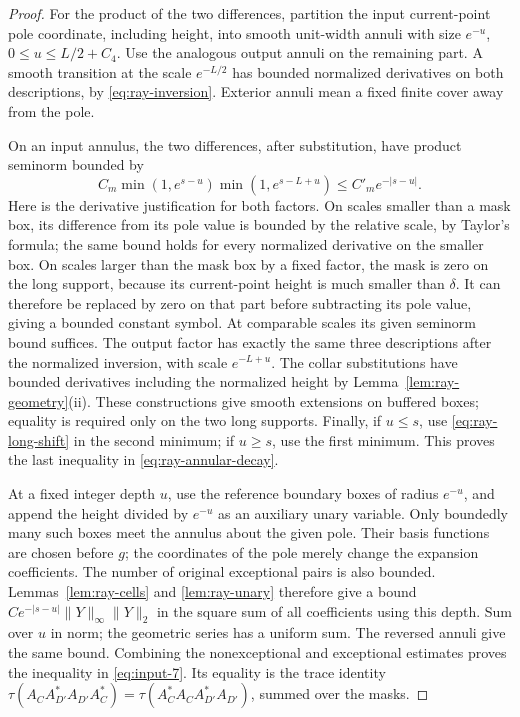 \begin{proof}
For the product of the two differences, partition the input
current-point pole coordinate, including height, into smooth
unit-width annuli with size \(e^{-u}\),
\(0\le u\le L/2+C_4\).  Use the analogous output annuli on the
remaining part.  A smooth transition at the scale \(e^{-L/2}\)
has bounded normalized derivatives on both descriptions, by
\eqref{eq:ray-inversion}.  Exterior annuli mean a fixed
finite cover away from the pole.

On an input annulus, the two differences, after substitution, have
product seminorm bounded by
\begin{equation}\label{eq:ray-annular-decay}
 C_m\min(1,e^{s-u})\min(1,e^{s-L+u})
                         \le C'_m e^{-|s-u|}.
\end{equation}
Here is the derivative justification for both factors.  On scales
smaller than a mask box, its difference from its pole value is
bounded by the relative scale, by Taylor's formula; the same bound
holds for every normalized derivative on the smaller box.  On scales
larger than the mask box by a fixed factor, the mask is zero on the
long support, because its current-point height is much smaller than
\(\delta\).  It can therefore be replaced by zero on that part before
subtracting its pole value, giving a bounded constant symbol.  At
comparable scales its given seminorm bound suffices.  The output
factor has exactly the same three descriptions after the normalized
inversion, with scale \(e^{-L+u}\).  The collar substitutions have
bounded derivatives including the normalized height by
Lemma~\ref{lem:ray-geometry}(ii).  These constructions give
smooth extensions on buffered boxes; equality is required only on
the two long supports.  Finally, if \(u\le s\), use
\eqref{eq:ray-long-shift} in the second minimum; if \(u\ge s\),
use the first minimum.  This proves the last inequality in
\eqref{eq:ray-annular-decay}.

At a fixed integer depth \(u\), use the reference boundary boxes of
radius \(e^{-u}\), and append the height divided by \(e^{-u}\) as
an auxiliary unary variable.  Only boundedly many such boxes meet
the annulus about the given pole.  Their basis functions are chosen
before \(g\); the coordinates of the pole merely change the
expansion coefficients.  The number of original exceptional pairs
is also bounded.  Lemmas~\ref{lem:ray-cells} and
\ref{lem:ray-unary} therefore give a bound
\(Ce^{-|s-u|}\|Y\|_\infty\|Y\|_2\) in the square sum of all
coefficients using this depth.  Sum over \(u\) in norm; the geometric
series has a uniform sum.  The reversed annuli give the same bound.
Combining the nonexceptional and exceptional estimates proves the
inequality in \eqref{eq:input-7}.  Its equality is the trace
identity
\(\tau(A_CA_{D'}^*A_{D'}A_C^*)
=\tau(A_C^*A_CA_{D'}^*A_{D'})\), summed over the masks.


\end{proof}

